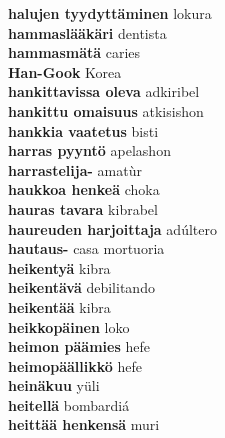 \textbf{ halujen tyydyttäminen  } lokura \\
\textbf{ hammaslääkäri  } dentista \\
\textbf{ hammasmätä  } caries \\
\textbf{ Han-Gook  } Korea \\
\textbf{ hankittavissa oleva  } adkiribel \\
\textbf{ hankittu omaisuus  } atkisishon \\
\textbf{ hankkia vaatetus  } bisti \\
\textbf{ harras pyyntö  } apelashon \\
\textbf{ harrastelija-  } amatùr \\
\textbf{ haukkoa henkeä  } choka \\
\textbf{ hauras tavara  } kibrabel \\
\textbf{ haureuden harjoittaja  } adúltero \\
\textbf{ hautaus-  } casa mortuoria \\
\textbf{ heikentyä  } kibra \\
\textbf{ heikentävä  } debilitando \\
\textbf{ heikentää  } kibra \\
\textbf{ heikkopäinen  } loko \\
\textbf{ heimon päämies  } hefe \\
\textbf{ heimopäällikkö  } hefe \\
\textbf{ heinäkuu  } yüli \\
\textbf{ heitellä  } bombardiá \\
\textbf{ heittää henkensä  } muri \\
